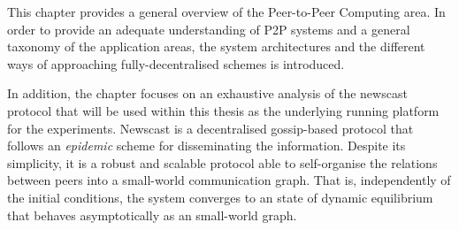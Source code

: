 This chapter provides a general overview of the Peer-to-Peer Computing area. In order to provide an adequate understanding of P2P systems and a general taxonomy of the application areas, the system architectures and the different ways of approaching fully-decentralised schemes is introduced. 

In addition, the chapter focuses on an exhaustive analysis of the newscast protocol that will be used within this thesis as the underlying running platform for the experiments.
Newscast is a decentralised gossip-based protocol that follows an \emph{epidemic} scheme for disseminating the information. Despite its simplicity, it is a robust and scalable protocol able to self-organise the relations between peers into a small-world communication graph. That is, independently of the initial conditions, the system converges to an state of dynamic equilibrium that behaves asymptotically as an small-world graph.





